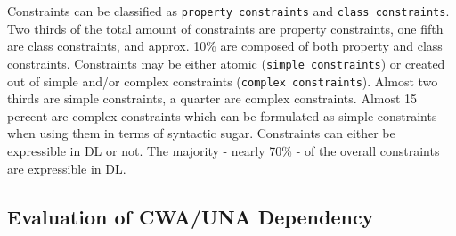 \documentclass{llncs}
\newcommand{\ms}[1]{\texttt{#1}}
\begin{document}
Constraints can be classified as \ms{property constraints} and \ms{class constraints}.
Two thirds of the total amount of constraints are property constraints, one fifth are class constraints, and approx. 10\% are composed of both property and class constraints.
Constraints may be either atomic (\ms{simple constraints}) or created out of simple and/or complex constraints (\ms{complex constraints}).
Almost two thirds are simple constraints, a quarter are complex constraints.
Almost 15 percent are complex constraints which can be formulated as simple constraints when using them in terms of syntactic sugar.
Constraints can either be expressible in DL or not.
The majority - nearly 70\% - of the overall constraints are expressible in DL.

\subsection{Evaluation of CWA/UNA Dependency}
\end{document}
